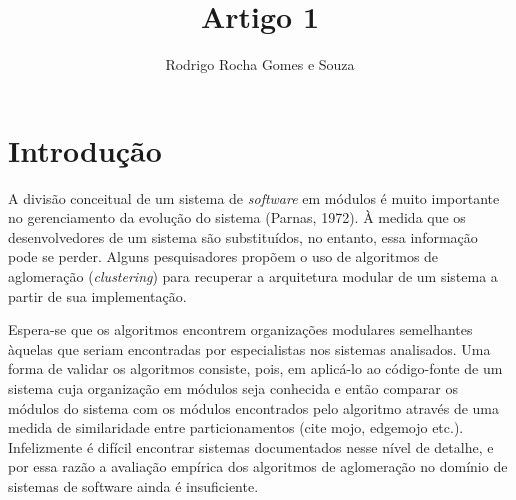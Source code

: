 \documentclass{acm_proc_article-sp}
\begin{document}
\title{Artigo 1} %
\author{Rodrigo Rocha Gomes e Souza}
\maketitle

\begin{abstract}



\end{abstract}

\section{Introdução} %

% 
% 


A divisão conceitual de um sistema de \emph{software} em módulos é muito importante no gerenciamento da evolução do sistema (Parnas, 1972). À medida que os desenvolvedores de um sistema são substituídos, no entanto, essa informação pode se perder. Alguns pesquisadores propõem o uso de algoritmos de aglomeração (\emph{clustering}) para recuperar a arquitetura modular de um sistema a partir de sua implementação.

Espera-se que os algoritmos encontrem organizações modulares semelhantes àquelas que seriam encontradas por  especialistas nos sistemas analisados. Uma forma de validar os algoritmos consiste, pois, em aplicá-lo ao código-fonte de um sistema cuja organização em módulos seja conhecida e então comparar os módulos do sistema com os módulos encontrados pelo algoritmo através de uma medida de similaridade entre particionamentos (cite mojo, edgemojo etc.). Infelizmente é difícil encontrar sistemas documentados nesse nível de detalhe, e por essa razão a avaliação empírica dos algoritmos de aglomeração no domínio de sistemas de software ainda é insuficiente.
\end{document}
